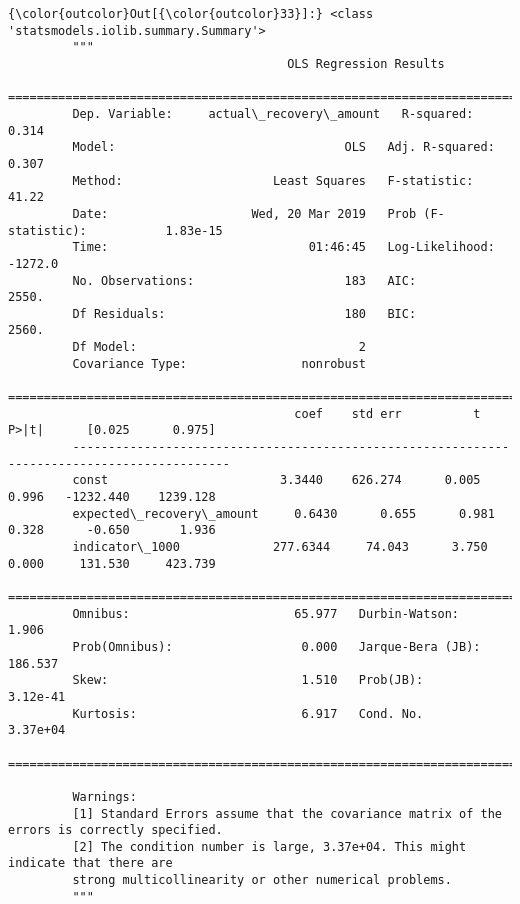 \documentclass[11pt]{article}
\begin{document}
\begin{Verbatim}[commandchars=\\\{\}]
{\color{outcolor}Out[{\color{outcolor}33}]:} <class 'statsmodels.iolib.summary.Summary'>
         """
                                       OLS Regression Results                              
         ==================================================================================
         Dep. Variable:     actual\_recovery\_amount   R-squared:                       0.314
         Model:                                OLS   Adj. R-squared:                  0.307
         Method:                     Least Squares   F-statistic:                     41.22
         Date:                    Wed, 20 Mar 2019   Prob (F-statistic):           1.83e-15
         Time:                            01:46:45   Log-Likelihood:                -1272.0
         No. Observations:                     183   AIC:                             2550.
         Df Residuals:                         180   BIC:                             2560.
         Df Model:                               2                                         
         Covariance Type:                nonrobust                                         
         ============================================================================================
                                        coef    std err          t      P>|t|      [0.025      0.975]
         --------------------------------------------------------------------------------------------
         const                        3.3440    626.274      0.005      0.996   -1232.440    1239.128
         expected\_recovery\_amount     0.6430      0.655      0.981      0.328      -0.650       1.936
         indicator\_1000             277.6344     74.043      3.750      0.000     131.530     423.739
         ==============================================================================
         Omnibus:                       65.977   Durbin-Watson:                   1.906
         Prob(Omnibus):                  0.000   Jarque-Bera (JB):              186.537
         Skew:                           1.510   Prob(JB):                     3.12e-41
         Kurtosis:                       6.917   Cond. No.                     3.37e+04
         ==============================================================================
         
         Warnings:
         [1] Standard Errors assume that the covariance matrix of the errors is correctly specified.
         [2] The condition number is large, 3.37e+04. This might indicate that there are
         strong multicollinearity or other numerical problems.
         """
\end{Verbatim}
            
\end{document}
